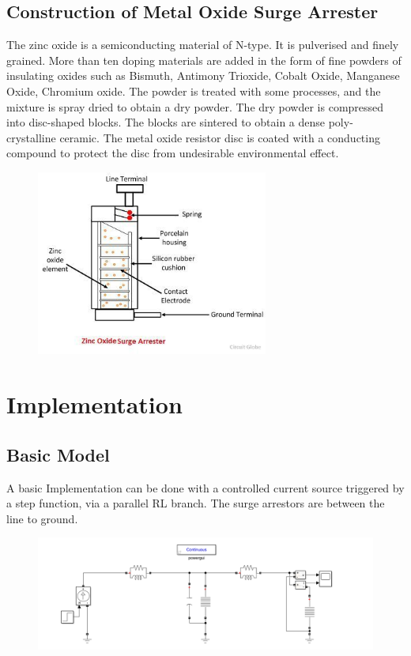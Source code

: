 \documentclass[a4paper,12pt]{article}
\begin{document}
    \subsection{Construction of Metal Oxide Surge Arrester}
    The zinc oxide is a semiconducting material of N-type. It is pulverised and finely grained. 
    More than ten doping materials are added in the form of fine powders of insulating oxides 
    such as Bismuth, Antimony Trioxide, Cobalt Oxide, Manganese Oxide, Chromium oxide. 
    The powder is treated with some processes, and the mixture is spray dried to obtain a dry powder.
    The dry powder is compressed into disc-shaped blocks. 
    The blocks are sintered to obtain a dense poly- crystalline ceramic.
    The metal oxide resistor disc is coated with a 
    conducting compound to protect the disc from undesirable environmental effect.

    \begin{figure}[H]
      \centering
      \includegraphics[width=3in]{img/ZNO-surge-diverter.jpg}
    \end{figure}

  \pagebreak
  \section{Implementation}
    \subsection{Basic Model}
    A basic Implementation can be done with a controlled current source triggered by a step
    function, via a parallel RL branch. The surge arrestors are between the line to ground.
    \begin{figure}[H]
      \centering
      \includegraphics[width=6in]{img/basic.png}
    \end{figure}
\end{document}
